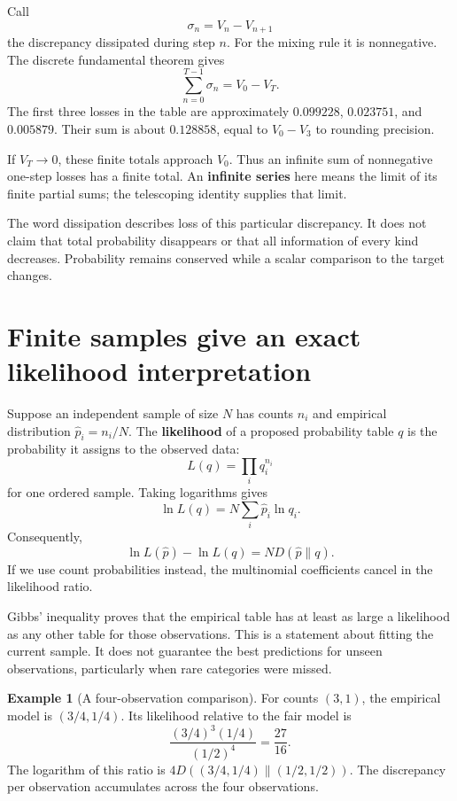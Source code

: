 \documentclass[11pt,oneside,openany]{book}
\theoremstyle{definition}
\newtheorem{example}{Example}[chapter]
\theoremstyle{remark}
\numberwithin{equation}{chapter}
\begin{document}
Call \[\sigma_n=V_n-V_{n+1}\] the discrepancy dissipated during step \(n\). For the mixing rule it is nonnegative. The discrete fundamental theorem gives \[\boxed{\sum_{n=0}^{T-1}\sigma_n=V_0-V_T.}\] The first three losses in the table are approximately \(0.099228\), \(0.023751\), and \(0.005879\). Their sum is about \(0.128858\), equal to \(V_0-V_3\) to rounding precision.

If \(V_T\to0\), these finite totals approach \(V_0\). Thus an infinite sum of nonnegative one-step losses has a finite total. An \textbf{infinite series} here means the limit of its finite partial sums; the telescoping identity supplies that limit.

The word dissipation describes loss of this particular discrepancy. It does not claim that total probability disappears or that all information of every kind decreases. Probability remains conserved while a scalar comparison to the target changes.

\section{Finite samples give an exact likelihood interpretation}\label{ch06-finite-samples-give-an-exact-likelihood-interpretation}

Suppose an independent sample of size \(N\) has counts \(n_i\) and empirical distribution \(\widehat p_i=n_i/N\). The \textbf{likelihood} of a proposed probability table \(q\) is the probability it assigns to the observed data: \[L(q)=\prod_i q_i^{n_i}\] for one ordered sample. Taking logarithms gives \[\ln L(q)=N\sum_i\widehat p_i\ln q_i.\] Consequently, \[\boxed{\ln L(\widehat p)-\ln L(q)=ND(\widehat p\|q).}\] If we use count probabilities instead, the multinomial coefficients cancel in the likelihood ratio.

Gibbs' inequality proves that the empirical table has at least as large a likelihood as any other table for those observations. This is a statement about fitting the current sample. It does not guarantee the best predictions for unseen observations, particularly when rare categories were missed.

\begin{example}[A four-observation comparison]

For counts \((3,1)\), the empirical model is \((3/4,1/4)\). Its likelihood relative to the fair model is \[\frac{(3/4)^3(1/4)}{(1/2)^4}=\frac{27}{16}.\] The logarithm of this ratio is \(4D((3/4,1/4)\|(1/2,1/2))\). The discrepancy per observation accumulates across the four observations.

\end{example}
\end{document}
